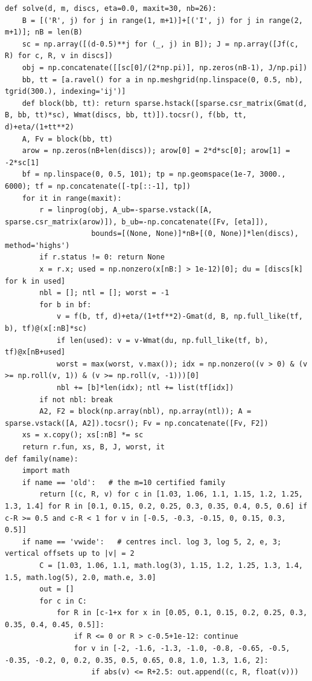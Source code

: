 \documentclass[11pt,reqno]{amsart}
\numberwithin{equation}{section}
\theoremstyle{definition}
\theoremstyle{remark}
\begin{document}
\begin{lstlisting}
def solve(d, m, discs, eta=0.0, maxit=30, nb=26):
    B = [('R', j) for j in range(1, m+1)]+[('I', j) for j in range(2, m+1)]; nB = len(B)
    sc = np.array([(d-0.5)**j for (_, j) in B]); J = np.array([Jf(c, R) for c, R, v in discs])
    obj = np.concatenate([[sc[0]/(2*np.pi)], np.zeros(nB-1), J/np.pi])
    bb, tt = [a.ravel() for a in np.meshgrid(np.linspace(0, 0.5, nb), tgrid(300.), indexing='ij')]
    def block(bb, tt): return sparse.hstack([sparse.csr_matrix(Gmat(d, B, bb, tt)*sc), Wmat(discs, bb, tt)]).tocsr(), f(bb, tt, d)+eta/(1+tt**2)
    A, Fv = block(bb, tt)
    arow = np.zeros(nB+len(discs)); arow[0] = 2*d*sc[0]; arow[1] = -2*sc[1]
    bf = np.linspace(0, 0.5, 101); tp = np.geomspace(1e-7, 3000., 6000); tf = np.concatenate([-tp[::-1], tp])
    for it in range(maxit):
        r = linprog(obj, A_ub=-sparse.vstack([A, sparse.csr_matrix(arow)]), b_ub=-np.concatenate([Fv, [eta]]),
                    bounds=[(None, None)]*nB+[(0, None)]*len(discs), method='highs')
        if r.status != 0: return None
        x = r.x; used = np.nonzero(x[nB:] > 1e-12)[0]; du = [discs[k] for k in used]
        nbl = []; ntl = []; worst = -1
        for b in bf:
            v = f(b, tf, d)+eta/(1+tf**2)-Gmat(d, B, np.full_like(tf, b), tf)@(x[:nB]*sc)
            if len(used): v = v-Wmat(du, np.full_like(tf, b), tf)@x[nB+used]
            worst = max(worst, v.max()); idx = np.nonzero((v > 0) & (v >= np.roll(v, 1)) & (v >= np.roll(v, -1)))[0]
            nbl += [b]*len(idx); ntl += list(tf[idx])
        if not nbl: break
        A2, F2 = block(np.array(nbl), np.array(ntl)); A = sparse.vstack([A, A2]).tocsr(); Fv = np.concatenate([Fv, F2])
    xs = x.copy(); xs[:nB] *= sc
    return r.fun, xs, B, J, worst, it
def family(name):
    import math
    if name == 'old':   # the m=10 certified family
        return [(c, R, v) for c in [1.03, 1.06, 1.1, 1.15, 1.2, 1.25, 1.3, 1.4] for R in [0.1, 0.15, 0.2, 0.25, 0.3, 0.35, 0.4, 0.5, 0.6] if c-R >= 0.5 and c-R < 1 for v in [-0.5, -0.3, -0.15, 0, 0.15, 0.3, 0.5]]
    if name == 'vwide':   # centres incl. log 3, log 5, 2, e, 3; vertical offsets up to |v| = 2
        C = [1.03, 1.06, 1.1, math.log(3), 1.15, 1.2, 1.25, 1.3, 1.4, 1.5, math.log(5), 2.0, math.e, 3.0]
        out = []
        for c in C:
            for R in [c-1+x for x in [0.05, 0.1, 0.15, 0.2, 0.25, 0.3, 0.35, 0.4, 0.45, 0.5]]:
                if R <= 0 or R > c-0.5+1e-12: continue
                for v in [-2, -1.6, -1.3, -1.0, -0.8, -0.65, -0.5, -0.35, -0.2, 0, 0.2, 0.35, 0.5, 0.65, 0.8, 1.0, 1.3, 1.6, 2]:
                    if abs(v) <= R+2.5: out.append((c, R, float(v)))

\end{lstlisting}
\end{document}
